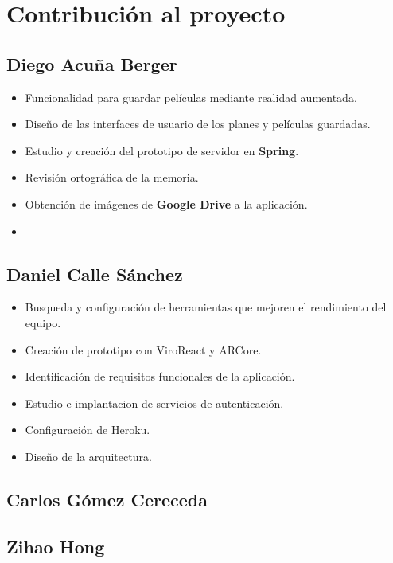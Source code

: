 
\cleardoublepage


\chapter{Contribución al proyecto}
\label{makereference9}

\section{Diego Acuña Berger}
\label{makereference9.1}
\begin{itemize}
    \item Funcionalidad para guardar películas mediante realidad aumentada.
    \item Diseño de las interfaces de usuario de los planes y películas guardadas.  
    \item Estudio y creación del prototipo de servidor en \textbf{Spring}.
    \item Revisión ortográfica de la memoria.
    \item Obtención de imágenes de \textbf{Google Drive} a la aplicación.
    \item 
\end{itemize}
\section{Daniel Calle Sánchez}
\label{makereference9.2}
\begin{itemize}  
    \item Busqueda y configuración de herramientas que mejoren el rendimiento del equipo.
    \item Creación de prototipo con ViroReact y ARCore.
    \item Identificación de requisitos funcionales de la aplicación.
    \item Estudio e implantacion de servicios de autenticación.
    \item Configuración de Heroku.
    \item Diseño de la arquitectura.
\end{itemize}

\section{Carlos Gómez Cereceda}
\label{makereference9.3}

\section{Zihao Hong}
\label{makereference9.4}